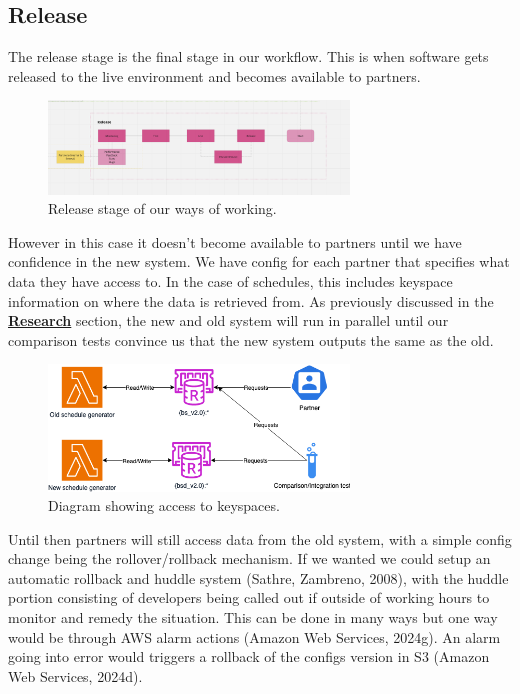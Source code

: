   \newpage
  \subsection{Release}
  The release stage is the final stage in our workflow. This is when software gets released to the live environment and becomes available to partners. 
  \begin{figure}[H]
    \centering
    \includegraphics[width=8cm]{assets/workflow/release.png}
    \caption{Release stage of our ways of working.}
    \label{fig:workflowRelease}
  \end{figure}
  
  However in this case it doesn't become available to partners until we have confidence in the new system. We have config for each partner that 
  specifies what data they have access to. In the case of schedules, this includes keyspace information on where the data is retrieved from. As 
  previously discussed in the \hyperref[sec:cicd]{\textbf{Research}} section, the new and old system will run in parallel until our comparison tests 
  convince us that the new system outputs the same as the old.

  \begin{figure}[H]
    \centering
    \includegraphics[width=8cm]{assets/keyspaceAccess.drawio.png}
    \caption{Diagram showing access to keyspaces.}
    \label{fig:keySpaceAccess}
  \end{figure}

  Until then partners will still access data from the old system, with a simple config change being the rollover/rollback mechanism. If we wanted we 
  could setup an automatic rollback and huddle system (Sathre, Zambreno, 2008), with the huddle portion consisting of developers being called out if 
  outside of working hours to monitor and remedy the situation. This can be done in many ways but one way would be through AWS alarm 
  actions (Amazon Web Services, 2024g). An alarm going into error would  triggers a rollback of the configs version in S3 (Amazon Web Services, 2024d).

